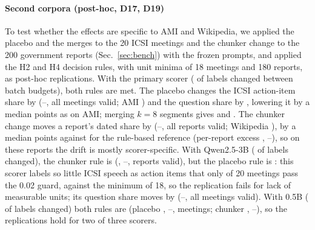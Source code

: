 \documentclass[conference]{IEEEtran}
\begin{document}
\paragraph*{Second corpora (post-hoc, D17, D19)} To test whether the effects are specific to AMI and Wikipedia, we
applied the placebo and the merges to the 20 ICSI meetings and the chunker change to the 200 government reports
(Sec.~\ref{sec:bench}) with the frozen prompts, and applied the H2 and H4 decision rules, with unit minima of 18 meetings
and 180 reports, as post-hoc replications. With the primary scorer (\nCorpDetPMism{} of \nCorpDetPN{} labels changed
between batch budgets), both rules are met. The placebo changes the ICSI action-item share by \nIcPWtwoAcD{}
(\nIcPWtwoAcDlo--\nIcPWtwoAcDhi, all \nIcPWtwoAcValid{} meetings valid; AMI \nHtwomed) and the question share by
\nIcPWtwoQuD, lowering it by a median \nIcPWtwoQuAbs{} points as on AMI; merging $k=8$ segments gives
\nIcPEsixkeightAcD{} and \nIcPEsixkeightQuD. The chunker change moves a report's dated share by \nCrsPD{}
(\nCrsPDlo--\nCrsPDhi, all \nCrsPValid{} reports valid; Wikipedia \nHfourmed), by a median \nCrsPAbs{} points against
\nCrsPRef{} for the rule-based reference (per-report excess \nCrsPEx, \nCrsPExLo--\nCrsPExHi), so on these reports the
drift is mostly scorer-specific. With Qwen2.5-3B (\nCorpDetTMism{} of \nCorpDetTN{} labels changed), the chunker rule
is \nRuleHfourT{} (\nCrsTD, \nCrsTDlo--\nCrsTDhi, \nCrsTValid{} reports valid), but the placebo rule is
\nRuleHtwoT: this scorer labels so little ICSI speech as action items that only \nIcTWtwoAcValid{} of 20 meetings
pass the 0.02 guard, against the minimum of 18, so the replication fails for lack of measurable units; its question
share moves by \nIcTWtwoQuD{} (\nIcTWtwoQuDlo--\nIcTWtwoQuDhi, all \nIcTWtwoQuValid{} meetings valid). With 0.5B
(\nCorpDetHMism{} of \nCorpDetHN{} labels changed) both rules are \nRuleHtwoH{} (placebo \nIcHWtwoAcD,
\nIcHWtwoAcDlo--\nIcHWtwoAcDhi, \nIcHWtwoAcValid{} meetings; chunker \nCrsHD, \nCrsHDlo--\nCrsHDhi), so the
replications hold for two of three scorers.
\begin{table}[t]
\centering\footnotesize
\caption{Post-hoc: word-weighted shares under each segmentation of the held-out meetings versus human dialogue-act
labels (median over 16 meetings, \%; primary model). $|$err$|$: absolute difference to the human share. F1: word-level
agreement with the human labels.}
\label{tab:gold}
\setlength{\tabcolsep}{4pt}

\end{table}
\end{document}
